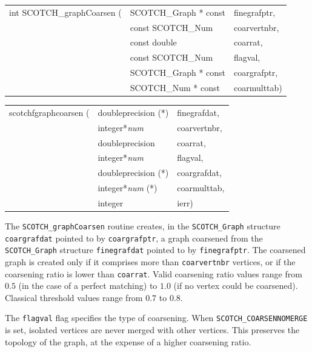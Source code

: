 \begin{itemize}
\progsyn

{\tt\begin{tabular}{l@{}ll}
int SCOTCH\_graphCoarsen ( & SCOTCH\_Graph * const & finegrafptr, \\
                           & const SCOTCH\_Num     & coarvertnbr, \\
                           & const double          & coarrat,     \\
                           & const SCOTCH\_Num     & flagval,     \\
                           & SCOTCH\_Graph * const & coargrafptr, \\
                           & SCOTCH\_Num * const   & coarmulttab) \\
\end{tabular}}

{\tt\begin{tabular}{l@{}ll}
scotchfgraphcoarsen ( & doubleprecision (*)   & finegrafdat, \\
                      & integer*{\it num}     & coarvertnbr, \\
                      & doubleprecision       & coarrat,     \\
                      & integer*{\it num}     & flagval,     \\
                      & doubleprecision (*)   & coargrafdat, \\
                      & integer*{\it num} (*) & coarmulttab, \\
                      & integer               & ierr)
\end{tabular}}

\progdes

The {\tt SCOTCH\_graphCoarsen} routine creates, in the
{\tt SCOTCH\_\lbt Graph} structure {\tt coar\lbt graf\lbt dat} pointed
to by {\tt coar\lbt graf\lbt ptr}, a graph coarsened from the
{\tt SCOTCH\_\lbt Graph} structure {\tt fine\lbt graf\lbt dat} pointed
to by {\tt fine\lbt graf\lbt ptr}. The coarsened graph is created only
if it comprises more than {\tt coar\lbt vert\lbt nbr} vertices, or if
the coarsening ratio is lower than {\tt coarrat}. Valid coarsening
ratio values range from $0.5$ (in the case of a perfect matching) to
$1.0$ (if no vertex could be coarsened). Classical threshold values
range from $0.7$ to $0.8$.

The {\tt flagval} flag specifies the type of coarsening.
When {\tt SCOTCH\_\lbt COARSEN\lbt NO\lbt MERGE} is set, isolated
vertices are never merged with other vertices. This preserves the
topology of the graph, at the expense of a higher coarsening ratio.


\end{itemize}

